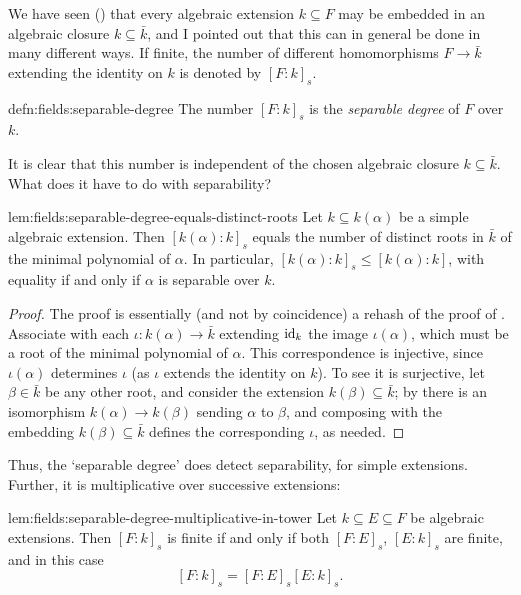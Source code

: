 We have seen () that every algebraic extension
$k \subseteq F$ may be embedded in an algebraic closure
$k \subseteq \bar{k}$, and I pointed out that this can in general be
done in many different ways.  If finite, the number of different
homomorphisms $F \to \bar{k}$ extending the identity on $k$ is denoted
by ${[F : k]}_s$.
\begin{defn}{}{defn:fields:separable-degree}
  The number ${[F : k]}_s$ is the \emph{separable degree} of $F$ over
  $k$.
\end{defn}
It is clear that this number is independent of the chosen algebraic
closure $k \subseteq \bar{k}$. What does it have to do with
separability?
\begin{lem}{}{lem:fields:separable-degree-equals-distinct-roots}
  Let $k \subseteq k(\alpha)$ be a simple algebraic extension. Then
  ${[k(\alpha) : k]}_s$ equals the number of distinct roots in
  $\bar{k}$ of the minimal polynomial of $\alpha$. In particular,
  ${[k(\alpha) : k]}_s \leq [k(\alpha) : k]$, with equality if and
  only if $\alpha$ is separable over $k$.
\end{lem}
\begin{proof}
  The proof is essentially (and not by coincidence) a rehash of the
  proof of . Associate with each
  $\iota : k(\alpha) \to \bar{k}$ extending $\operatorname{id}_k$ the image
  $\iota(\alpha)$, which must be a root of the minimal polynomial of
  $\alpha$. This correspondence is injective, since $\iota(\alpha)$
  determines $\iota$ (as $\iota$ extends the identity on $k$). To see
  it is surjective, let $\beta \in \bar{k}$ be any other root, and
  consider the extension $k(\beta) \subseteq \bar{k}$; by
   there is an isomorphism
  $k(\alpha) \to k(\beta)$ sending $\alpha$ to $\beta$, and composing
  with the embedding $k(\beta) \subseteq \bar{k}$ defines the
  corresponding $\iota$, as needed.
\end{proof}
Thus, the `separable degree' does detect separability, for simple
extensions. Further, it is multiplicative over successive extensions:
\begin{lem}{}{lem:fields:separable-degree-multiplicative-in-tower}
  Let $k \subseteq E \subseteq F$ be algebraic extensions. Then
  ${[F : k]}_s$ is finite if and only if both ${[F : E]}_s$,
  ${[E : k]}_s$ are finite, and in this case
  \[ {[F : k]}_s = {[F : E]}_s {[E : k]}_s.
  \]
\end{lem}

